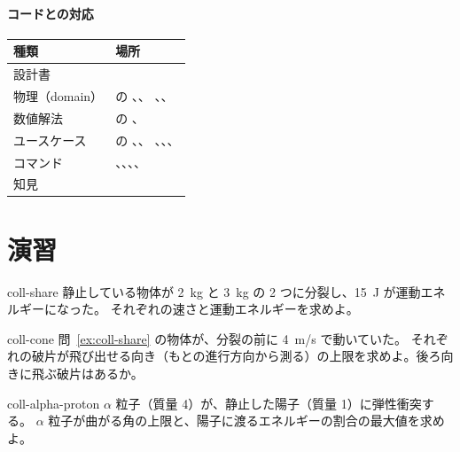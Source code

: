 \paragraph{コードとの対応}
\begin{center}
\begin{tabularx}{\linewidth}{@{}lL@{}}
\toprule
種類 & 場所 \\
\midrule
設計書 &  \\
物理（domain） &  の 、、
  、、 \\
数値解法 &  の 、 \\
ユースケース &  の 、、
  、、、 \\
コマンド & 、、、、 \\
知見 &  \\
\bottomrule
\end{tabularx}
\end{center}

\section{演習}\label{sec:coll-exercises}

\begin{exercise}[基礎]{coll-share}
静止している物体が \qty{2}{kg} と \qty{3}{kg} の 2 つに分裂し、\qty{15}{J} が運動エネルギーになった。
それぞれの速さと運動エネルギーを求めよ。
\end{exercise}

\begin{exercise}[基礎]{coll-cone}
問~\ref{ex:coll-share} の物体が、分裂の前に \qty{4}{m/s} で動いていた。
それぞれの破片が飛び出せる向き（もとの進行方向から測る）の上限を求めよ。後ろ向きに飛ぶ破片はあるか。
\end{exercise}

\begin{exercise}[基礎]{coll-alpha-proton}
$\alpha$ 粒子（質量 4）が、静止した陽子（質量 1）に弾性衝突する。
$\alpha$ 粒子が曲がる角の上限と、陽子に渡るエネルギーの割合の最大値を求めよ。
\end{exercise}

